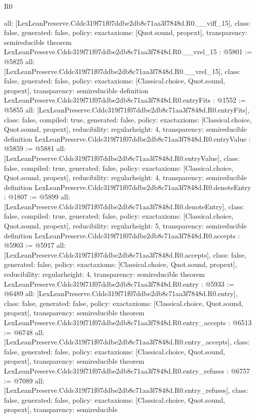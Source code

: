 \begin{lexlean}{R0}
\begin{coremodule}
{  all: [LexLeanPreserve.Cddc319f71f07ddbe2db8c71aa3f7848d.R0.__viff_15],
  class: false,
  generated: false,
  policy: exact{axioms: [Quot.sound, propext]},
  transparency: semireducible
}
theorem LexLeanPreserve.Cddc319f71f07ddbe2db8c71aa3f7848d.R0.__vrel_15 : @5801 := @5825 {
  all: [LexLeanPreserve.Cddc319f71f07ddbe2db8c71aa3f7848d.R0.__vrel_15],
  class: false,
  generated: false,
  policy: exact{axioms: [Classical.choice, Quot.sound, propext]},
  transparency: semireducible
}
definition LexLeanPreserve.Cddc319f71f07ddbe2db8c71aa3f7848d.R0.entryFits : @1552 := @5855 {
  all: [LexLeanPreserve.Cddc319f71f07ddbe2db8c71aa3f7848d.R0.entryFits],
  class: false,
  compiled: true,
  generated: false,
  policy: exact{axioms: [Classical.choice, Quot.sound, propext]},
  reducibility: regular{height: 4},
  transparency: semireducible
}
definition LexLeanPreserve.Cddc319f71f07ddbe2db8c71aa3f7848d.R0.entryValue : @5859 := @5881 {
  all: [LexLeanPreserve.Cddc319f71f07ddbe2db8c71aa3f7848d.R0.entryValue],
  class: false,
  compiled: true,
  generated: false,
  policy: exact{axioms: [Classical.choice, Quot.sound, propext]},
  reducibility: regular{height: 4},
  transparency: semireducible
}
definition LexLeanPreserve.Cddc319f71f07ddbe2db8c71aa3f7848d.R0.denoteEntry : @1807 := @5899 {
  all: [LexLeanPreserve.Cddc319f71f07ddbe2db8c71aa3f7848d.R0.denoteEntry],
  class: false,
  compiled: true,
  generated: false,
  policy: exact{axioms: [Classical.choice, Quot.sound, propext]},
  reducibility: regular{height: 5},
  transparency: semireducible
}
definition LexLeanPreserve.Cddc319f71f07ddbe2db8c71aa3f7848d.R0.accepts : @5903 := @5917 {
  all: [LexLeanPreserve.Cddc319f71f07ddbe2db8c71aa3f7848d.R0.accepts],
  class: false,
  generated: false,
  policy: exact{axioms: [Classical.choice, Quot.sound, propext]},
  reducibility: regular{height: 4},
  transparency: semireducible
}
theorem LexLeanPreserve.Cddc319f71f07ddbe2db8c71aa3f7848d.R0.entry : @5933 := @6489 {
  all: [LexLeanPreserve.Cddc319f71f07ddbe2db8c71aa3f7848d.R0.entry],
  class: false,
  generated: false,
  policy: exact{axioms: [Classical.choice, Quot.sound, propext]},
  transparency: semireducible
}
theorem LexLeanPreserve.Cddc319f71f07ddbe2db8c71aa3f7848d.R0.entry_accepts : @6513 := @6748 {
  all: [LexLeanPreserve.Cddc319f71f07ddbe2db8c71aa3f7848d.R0.entry_accepts],
  class: false,
  generated: false,
  policy: exact{axioms: [Classical.choice, Quot.sound, propext]},
  transparency: semireducible
}
theorem LexLeanPreserve.Cddc319f71f07ddbe2db8c71aa3f7848d.R0.entry_refuses : @6757 := @7089 {
  all: [LexLeanPreserve.Cddc319f71f07ddbe2db8c71aa3f7848d.R0.entry_refuses],
  class: false,
  generated: false,
  policy: exact{axioms: [Classical.choice, Quot.sound, propext]},
  transparency: semireducible
}


\end{coremodule}
\end{lexlean}
